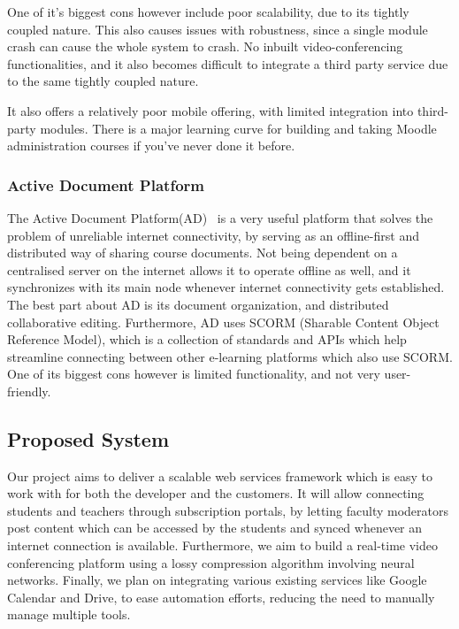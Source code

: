 One of it’s biggest cons however include poor scalability, due to its tightly coupled nature. 
This also causes issues with robustness, since a single module crash can cause the whole system to crash. 
No inbuilt video-conferencing functionalities, and it also becomes difficult to integrate a 
third party service due to the same tightly coupled nature.

It also offers a relatively poor mobile offering, with limited integration into third-party modules. 
There is a major learning curve for building and taking Moodle administration courses if you've never done it before.

\subsubsection{Active Document Platform}

The Active Document Platform(AD)~\cite{ActiveDocument} is a very useful platform that 
solves the problem of unreliable internet connectivity, by serving as an offline-first 
and distributed way of sharing course documents. Not being dependent on a centralised 
server on the internet allows it to operate offline as well, and it synchronizes with 
its main node whenever internet connectivity gets established. The best part about AD 
is its document organization, and distributed collaborative editing. Furthermore, AD 
uses SCORM (Sharable Content Object Reference Model), which is a collection of standards 
and APIs which help streamline connecting between other e-learning platforms which also 
use SCORM. One of its biggest cons however is limited functionality, and not very user-friendly.

\subsection{Proposed System}

Our project aims to deliver a scalable web services framework which is easy to work with 
for both the developer and the customers. It will allow connecting students and teachers 
through subscription portals, by letting faculty moderators post content which can be accessed 
by the students and synced whenever an internet connection is available. 
Furthermore, we aim to build a real-time video conferencing platform using a lossy compression 
algorithm involving neural networks. 
Finally, we plan on integrating various existing services like Google Calendar and Drive, 
to ease automation efforts, reducing the need to manually manage multiple tools.

